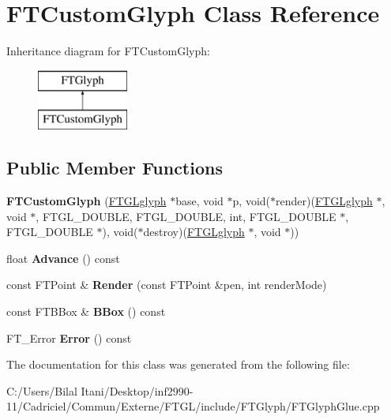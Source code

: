 \hypertarget{class_f_t_custom_glyph}{}\section{F\+T\+Custom\+Glyph Class Reference}
\label{class_f_t_custom_glyph}
Inheritance diagram for F\+T\+Custom\+Glyph\+:\begin{figure}[H]
\begin{center}
\leavevmode
\includegraphics[height=2.000000cm]{class_f_t_custom_glyph}
\end{center}
\end{figure}
\subsection*{Public Member Functions}
\begin{DoxyCompactItemize}
\item 
{\bfseries F\+T\+Custom\+Glyph} (\hyperlink{struct___f_t_g_lglyph}{F\+T\+G\+Lglyph} $\ast$base, void $\ast$p, void($\ast$render)(\hyperlink{struct___f_t_g_lglyph}{F\+T\+G\+Lglyph} $\ast$, void $\ast$, F\+T\+G\+L\+\_\+\+D\+O\+U\+B\+LE, F\+T\+G\+L\+\_\+\+D\+O\+U\+B\+LE,                                                                                                                               int, F\+T\+G\+L\+\_\+\+D\+O\+U\+B\+LE $\ast$, F\+T\+G\+L\+\_\+\+D\+O\+U\+B\+LE $\ast$), void($\ast$destroy)(\hyperlink{struct___f_t_g_lglyph}{F\+T\+G\+Lglyph} $\ast$, void $\ast$))\hypertarget{class_f_t_custom_glyph_abd191f1542bfd6d483bdf9dfd22957ec}{}\label{class_f_t_custom_glyph_abd191f1542bfd6d483bdf9dfd22957ec}

\item 
float {\bfseries Advance} () const \hypertarget{class_f_t_custom_glyph_aa8f17e3a9547eafed913e2b8f9b70958}{}\label{class_f_t_custom_glyph_aa8f17e3a9547eafed913e2b8f9b70958}

\item 
const F\+T\+Point \& {\bfseries Render} (const F\+T\+Point \&pen, int render\+Mode)\hypertarget{class_f_t_custom_glyph_a29285cf4a9b5476a80b01e1678272bd6}{}\label{class_f_t_custom_glyph_a29285cf4a9b5476a80b01e1678272bd6}

\item 
const F\+T\+B\+Box \& {\bfseries B\+Box} () const \hypertarget{class_f_t_custom_glyph_aebed1d1515a24d6410f4c3f44686b75c}{}\label{class_f_t_custom_glyph_aebed1d1515a24d6410f4c3f44686b75c}

\item 
F\+T\+\_\+\+Error {\bfseries Error} () const \hypertarget{class_f_t_custom_glyph_a8a74b76186fb02da48849c3c094fb72e}{}\label{class_f_t_custom_glyph_a8a74b76186fb02da48849c3c094fb72e}

\end{DoxyCompactItemize}


The documentation for this class was generated from the following file\+:\begin{DoxyCompactItemize}
\item 
C\+:/\+Users/\+Bilal Itani/\+Desktop/inf2990-\/11/\+Cadriciel/\+Commun/\+Externe/\+F\+T\+G\+L/include/\+F\+T\+Glyph/F\+T\+Glyph\+Glue.\+cpp\end{DoxyCompactItemize}
